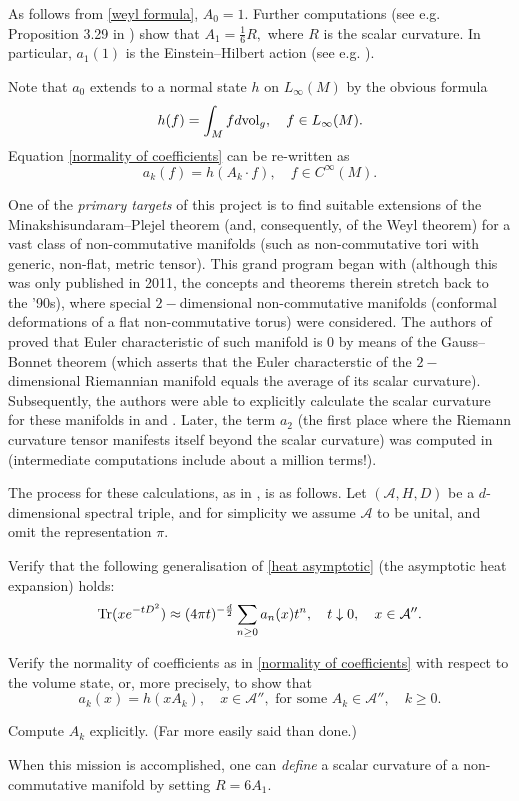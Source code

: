 \documentclass[12pt]{article}
\begin{document}
As follows from \eqref{weyl formula}, $A_0=1.$ Further computations (see e.g. Proposition 3.29 in \cite{Rosenberg}) show that $A_1=\frac16 R,$ where $R$ is the scalar curvature. In particular, $a_1(1)$ is the Einstein--Hilbert action (see e.g. \cite{Connes-book}).

Note that $a_0$ extends to a normal state $h$ on $L_{\infty}(M)$ by the obvious formula
$$h(f)=\int_M fd{\rm vol}_g,\quad f\in L_{\infty}(M).$$
Equation \eqref{normality of coefficients} can be re-written as
$$a_k(f)=h(A_k\cdot f),\quad f\in C^{\infty}(M).$$

One of the {\it primary targets} of this project is to find suitable extensions 
of the Minakshisundaram--Plejel theorem (and, consequently, of the Weyl theorem) 
for a vast class of non-commutative manifolds (such as non-commutative tori with 
generic, non-flat, metric tensor). 
This grand program began with \cite{ConnesTretkoff} 
(although this was only published in 2011, the concepts and theorems therein
stretch back to the '90s), where special $2-$dimensional non-commutative manifolds
(conformal deformations of a flat non-commutative torus) were considered.
The authors of \cite{ConnesTretkoff} proved that Euler characteristic of such 
manifold is $0$ by means of the Gauss--Bonnet theorem (which asserts that the Euler 
characterstic of the $2-$dimensional Riemannian manifold equals the average of
its scalar curvature). 
Subsequently, the authors were able to explicitly calculate the scalar curvature for these manifolds in \cite{ConnesMoscovici_curvature} and \cite{FathizadehKhalkhali}.
Later, the term $a_2$ (the first place where the Riemann curvature tensor manifests itself beyond the scalar curvature) was computed in \cite{ConnesFathizadeh} (intermediate computations include about a million terms!).

The process for these calculations, as in \cite{ConnesTretkoff}, is as follows.
Let $(\mathcal A,H,D)$ be a $d$-dimensional spectral triple, and for simplicity
we assume $\mathcal A$ to be unital, and omit the representation $\pi$.
\begin{steps}
\item\label{raph2} Verify that the following generalisation of \eqref{heat asymptotic} (the asymptotic heat expansion) holds:
$${\rm Tr}(xe^{-tD^2})\approx (4\pi t)^{-\frac{d}{2}} \sum_{n\geq0}a_n(x)t^n,\quad t\downarrow0,\quad x\in\mathcal{A}''.$$
\item\label{raph3} Verify the normality of coefficients as in \eqref{normality of coefficients} with respect to the volume state, or, more precisely, to show that
$$a_k(x)=h(xA_k),\quad x\in\mathcal{A}'',\mbox{ for some }A_k\in\mathcal{A}'',\quad k\geq0.$$
\item\label{raph4} Compute $A_k$ explicitly. (Far more easily said than done.)
\end{steps}
When this mission is accomplished, one can {\it define} a scalar curvature of a non-commutative manifold by setting $R=6A_1.$
\end{document}
